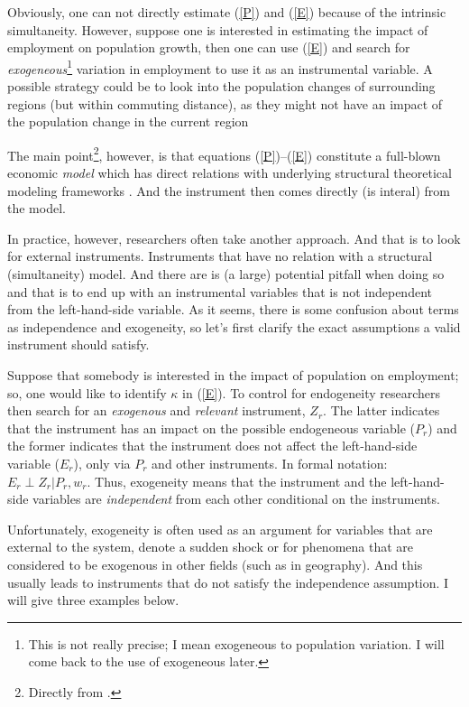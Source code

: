 \documentclass[fleqn,10pt]{SelfArx} %
\begin{document}
Obviously, one can not directly estimate (\ref{P}) and (\ref{E}) because of the
intrinsic simultaneity. However, suppose one is interested in estimating the
impact of employment on population growth, then one can use (\ref{E}) and search
for \emph{exogeneous}\footnote{This is not really precise; I mean exogeneous to
  population variation. I will come back to the use of exogeneous later.} variation in employment to use it as an instrumental
variable. A possible strategy could be to look into the population changes of
surrounding regions (but within commuting distance), as they might not have an
impact of the population change in the current region
\citep[see][]{DeGraaff2012, Graaff2012}

The main point\footnote{Directly from \cite{deaton2010instruments}.},
however, is that equations (\ref{P})--(\ref{E}) constitute a full-blown
economic \emph{model} which has direct relations with underlying structural
theoretical modeling frameworks \citep[such as][]{roback1982wages}. And the
instrument then comes directly (is interal) from the model. 

In practice, however, researchers often take another approach. And that is to
look for external instruments. Instruments that have no relation with a
structural (simultaneity) model. And there are is (a large) potential pitfall when doing so
and that is to end up with an instrumental variables that is not independent from
the left-hand-side variable. As it seems, there is some confusion about terms as
independence and exogeneity, so let's first clarify the exact assumptions a
valid instrument should satisfy.

Suppose that somebody is interested in the impact of population on employment; so, one would like to
identify $\kappa$ in (\ref{E}). To control for endogeneity researchers then
search for an \emph{exogenous} and \emph{relevant} instrument, $Z_r$. The latter
indicates that the instrument has an impact on the possible endogeneous variable
($P_r$) and the former indicates that the instrument does not affect the
left-hand-side variable ($E_r$), only via $P_r$ and other instruments. In formal
notation: $E_r \perp Z_r|P_r, w_r$. Thus, exogeneity means that the instrument
and the left-hand-side variables are \emph{independent} from each other conditional on
the instruments.

Unfortunately, exogeneity is often used as an argument for variables that are
external to the system, denote a sudden shock or for phenomena that are
considered to be exogenous in other fields (such as in geography).
And this usually leads to instruments that do not satisfy the
independence assumption. I will give three examples below.
\end{document}
